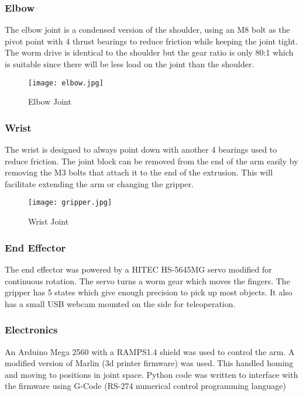 \subsubsection{Elbow}
The elbow joint is a condensed version of the shoulder, using an M8 bolt as the pivot point with 4 thrust bearings to reduce friction while keeping the joint tight. The worm drive is identical to the shoulder but the gear ratio is only 80:1 which is suitable since there will be less load on the joint than the shoulder.

\begin{figure}[!htb]
\begin{center}
\texttt{[image: elbow.jpg]}
\end{center}
\caption{Elbow Joint}
\label{fig:elbow}
\end{figure}

\subsubsection{Wrist}
The wrist is designed to always point down with another 4 bearings used to reduce friction. The joint block can be removed from the end of the arm easily by removing the M3 bolts that attach it to the end of the extrusion. This will facilitate extending the arm or changing the gripper.

\begin{figure}[!htb]
\begin{center}
\texttt{[image: gripper.jpg]}
\end{center}
\caption{Wrist Joint}
\label{fig:wrist}
\end{figure}

\subsubsection{End Effector}
The end effector was powered by a HITEC HS-5645MG servo modified for continuous rotation. The servo turns a worm gear which moves the fingers. The gripper has 5 states which give enough precision to pick up most objects. It also has a small USB webcam mounted on the side for teleoperation.


\subsubsection{Electronics}
An Arduino Mega 2560 with a RAMPS1.4 shield was used to control the arm. A modified version of Marlin (3d printer firmware) was used. This handled homing and moving to positions in joint space. Python code was written to interface with the firmware using G-Code  (RS-274 numerical control programming language) 

